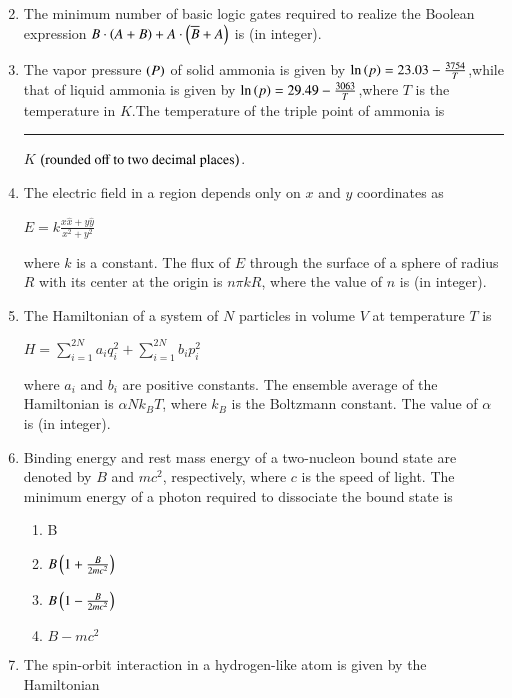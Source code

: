 \documentclass[journal]{IEEEtran}
\begin{document}
\begin{enumerate}
\begin{enumerate}
\begin{multicols}{2}
\end{multicols} 
\end{enumerate}
\item The minimum number of basic logic gates required to realize the Boolean expression $B \cdot\left(A+B\right)+A\cdot\left(\overline{B}+A\right)$  is \underline{\hspace{2cm}} (in integer).\\
\item The vapor pressure $\left(P\right)$ of solid ammonia is given by $\ln{\ensuremath{\left(p\right)}}=23.03-\frac{3754}{T}$,while that of liquid ammonia is given by $\ln{\ensuremath{\left(p\right)}}=29.49-\frac{3063}{T}$,where $T$ is the temperature in $K$.The temperature of the triple point of ammonia is \rule{2cm}{0.4pt} $K$ $\left(\text{rounded off to two decimal places}\right)$. \\
\item The electric field in a region depends only on $x$ and $y$ coordinates as
\begin{center}
 $E = k\frac{x\hat{x}+y\hat{y}}{x^2 + y^2}$   
\end{center}
where $k$ is a constant. The flux of $E$ through the surface of a sphere of radius $R$ with its center at the origin is $n \pi k R$, where the value of $n$ is \underline{\hspace{1cm}} (in integer).\\
\item The Hamiltonian of a system of $N$ particles in volume $V$ at temperature $T$ is
\begin{center}
$H = \sum\limits_{i=1}^{2N} a_i q_i^2 + \sum\limits_{i=1}^{2N} b_i p_i^2$
\end{center}
where $a_i$ and $b_i$ are positive constants. The ensemble average of the Hamiltonian is $\alpha N k_B T$, where $k_B$ is the Boltzmann constant. The value of $\alpha$ is \underline{\hspace{1cm}} (in integer).
\newpage
\item Binding energy and rest mass energy of a two-nucleon bound state are denoted by $ B$  and  $mc^2$, respectively, where $c$ is the speed of light. The minimum energy of a photon required to dissociate the bound state is
\begin{enumerate}
\item B
\item $B\left( 1 + \frac{B}{2mc^2}\right)$
\item $B\left(1 - \frac{B}{2mc^2}\right)$
\item $B-mc^2$
\end{enumerate}
\item The spin-orbit interaction in a hydrogen-like atom is given by the Hamiltonian

\end{enumerate}
\end{document}
